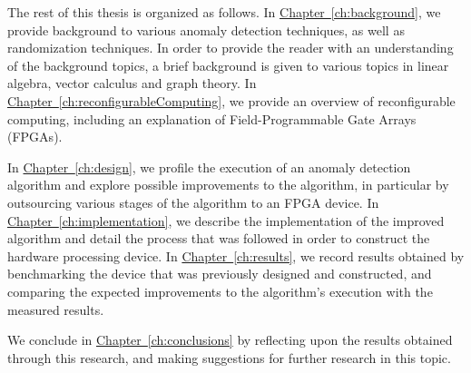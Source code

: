 The rest of this thesis is organized as follows. In \hyperref[ch:background]
{Chapter~\ref{ch:background}}, we provide background to various anomaly 
detection techniques, as well as randomization techniques. In order to provide 
the reader with an understanding of the background topics, a brief background is
given to various topics in linear algebra, vector calculus and graph theory. In
\hyperref[ch:reconfigurableComputing]{Chapter~\ref{ch:reconfigurableComputing}}, 
we provide an overview of reconfigurable computing, including an explanation of 
Field-Programmable Gate Arrays (FPGAs).

In \hyperref[ch:design] {Chapter~\ref{ch:design}}, we profile the execution of 
an anomaly detection algorithm and explore possible improvements to the 
algorithm, in particular by outsourcing various stages of the algorithm to an 
FPGA device. In \hyperref[ch:implementation]{Chapter~\ref{ch:implementation}}, 
we describe the implementation of the improved algorithm and detail the process 
that was followed in order to construct the hardware processing device. In 
\hyperref[ch:results]{Chapter~\ref{ch:results}}, we record results obtained by 
benchmarking the device that was previously designed and constructed, and 
comparing the expected improvements to the algorithm's execution with the 
measured results.

We conclude in \hyperref[ch:conclusions] {Chapter~\ref{ch:conclusions}} by 
reflecting upon the results obtained through this research, and making 
suggestions for further research in this topic.

